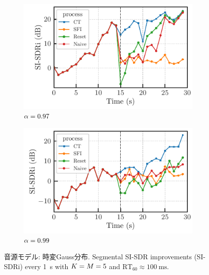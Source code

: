 \documentclass[twocolumn,9pt,dvipdfmx]{article}
\begin{document}
\begin{figure}[t]
  \begin{subfigure}{\columnwidth}
    \centering
    \includegraphics{figures/plots/online/Gauss_8000_97.pdf}
    \caption{$\alpha = 0.97$}%
    \label{fig:plot:batch:gauss:97}
  \end{subfigure}%

  \begin{subfigure}{\columnwidth}
    \centering
    \includegraphics{figures/plots/online/Gauss_8000_99.pdf}
    \caption{$\alpha = 0.99$}%
    \label{fig:plot:batch:gauss:99}
  \end{subfigure}%
  \caption{音源モデル: 時変Gauss分布. Segmental SI-SDR improvements (SI-SDRi) every \SI{1}{\second} with $K = M = 5$ and $\text{RT}_{60} \approx \SI{100}{\milli\second}$.}
\end{figure}
\end{document}
